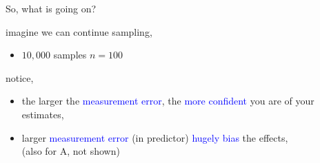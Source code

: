 \begin{lhframe}[rhgraphic={\texttt{[image: descendant5\_samplesize.pdf]}}]
	{So, what is going on?}
	
	imagine we can continue sampling,
	\begin{itemize}
		\item $10,000$ samples $n=100$
	\end{itemize}
	
	notice,
	\begin{itemize}
		\item the larger the \textcolor{blue}{measurement error}, the \textcolor{blue}{more confident} you are of your estimates,
		\item larger \textcolor{blue}{measurement error} (in predictor) \textcolor{blue}{hugely bias} the effects, \\
		{\small (also for A, not shown)}
	\end{itemize}
\end{lhframe}
%
%
